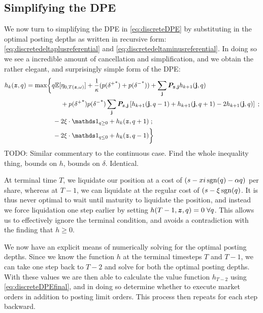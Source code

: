 \subsection{Simplifying the DPE}
We now turn to simplifying the DPE in \eqref{eq:discreteDPE} by substituting in the optimal posting depths as written in recursive form: \eqref{eq:discretedeltaplusreferential} and \eqref{eq:discretedeltaminusreferential}. In doing so we see a incredible amount of cancellation and simplification, and we obtain the rather elegant, and surprisingly simple form of the DPE:
\begin{equation}
\label{eq:discreteDPEfinal}
\begin{split}
h_k(\bz,q) & = \max \biggl\lbrace 
q\E[\eta_{0,T(\bz, \omega)}] + \frac{1}{\kappa}(p({\delta^+}^*)+p({\delta^-}^*))  + \sum_{\bj} \bP_{\bz,\bj} h_{k+1}(\bj,q) \\ 
& \hphantom{{}={} \max \biggl\lbrace {}+{}} + p({\delta^+}^*)p({\delta^-}^*)\sum_\bj \bP_{\bz,\bj} \left[ h_{k+1}(\bj, q-1) + h_{k+1}(\bj, q+1) -2 h_{k+1}(\bj, q)  \right] \; ; \\
& \hphantom{{}={} \max \biggl\lbrace } -2\xi \cdot \indicator_{q \geq 0} + h_k(\bz,q+1) \; ; \\
& \hphantom{{}={} \max \biggl\lbrace } -2\xi \cdot \indicator_{q \leq 0} + h_k(\bz,q-1) \biggr\rbrace
\end{split}
\end{equation}
TODO: Similar commentary to the continuous case. Find the whole inequality thing, bounds on $h$, bounds on $\delta$. Identical.

At terminal time $T$, we liquidate our position at a cost of $(s - xi \operatorname{\mathrm{sgn}}(q) - \alpha q)$ per share, whereas at $T-1$, we can liquidate at the regular cost of $(s - \xi \operatorname{\mathrm{sgn}}(q)$. It is thus never optimal to wait until maturity to liquidate the position, and instead we force liquidation one step earlier by setting $h(T-1,\bm{z},q) = 0 \; \forall q$. This allows us to effectively ignore the terminal condition, and avoids a contradiction with the finding that $h \geq 0$.

We now have an explicit means of numerically solving for the optimal posting depths. Since we know the function $h$ at the terminal timesteps $T$ and $T-1$, we can take one step back to $T-2$ and solve for both the optimal posting depths. With these values we are then able to calculate the value function $h_{T-2}$ using \eqref{eq:discreteDPEfinal}, and in doing so determine whether to execute market orders in addition to posting limit orders. This process then repeats for each step backward.